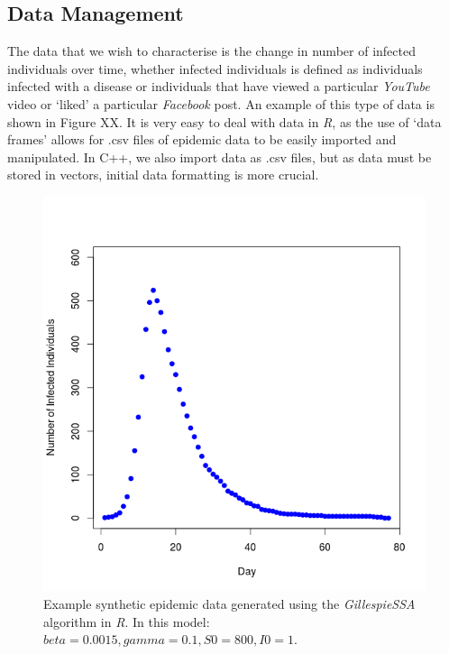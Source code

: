 \documentclass[11pt, a4paper, oneside,titlepage]{article}
\begin{document}
\subsection{Data Management}
The data that we wish to characterise is the change in number of
infected individuals over time, whether infected individuals is
defined as individuals infected with a disease or individuals that
have viewed a particular \emph{YouTube} video or `liked' a particular
\emph{Facebook} post. An example of this type of data is shown in
Figure XX. It is very easy to deal with data in \emph{R}, as the use
of `data frames' allows for .csv files of epidemic data to be easily
imported and manipulated. In C++, we also import data as .csv files,
but as data must be stored in vectors, initial data formatting is more
crucial. 


\begin{center}
\begin{figure}[ht!]

\includegraphics[width=15cm]{simplesir.png}
\caption{Example synthetic epidemic data generated using the
  \emph{GillespieSSA} algorithm in \emph{R}. In this model: $beta =
  0.0015, gamma = 0.1, S0 = 800, I0 = 1$.}
\end{figure}  
\end{center}
\end{document}
